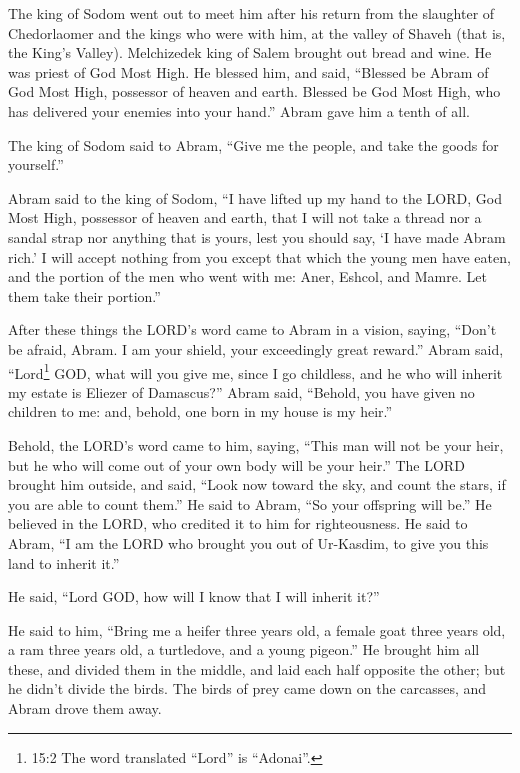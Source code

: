 \myverse{}The king of Sodom went out to meet him after his return from the slaughter of Chedorlaomer and the kings who were with him, at the valley of Shaveh (that is, the King’s Valley).  \myverse{}Melchizedek king of Salem brought out bread and wine. He was priest of God Most High.  \myverse{}He blessed him, and said, “Blessed be Abram of God Most High, possessor of heaven and earth.  \myverse{}Blessed be God Most High, who has delivered your enemies into your hand.”
Abram gave him a tenth of all.

\myverse{}The king of Sodom said to Abram, “Give me the people, and take the goods for yourself.”

\myverse{}Abram said to the king of Sodom, “I have lifted up my hand to the LORD, God Most High, possessor of heaven and earth,  \myverse{}that I will not take a thread nor a sandal strap nor anything that is yours, lest you should say, ‘I have made Abram rich.’  \myverse{}I will accept nothing from you except that which the young men have eaten, and the portion of the men who went with me: Aner, Eshcol, and Mamre. Let them take their portion.”

\mychapter{}
\myverse*{}After these things the LORD’s word came to Abram in a vision, saying, “Don’t be afraid, Abram. I am your shield, your exceedingly great reward.”
\myverse{}Abram said, “Lord\footnote{15:2 The word translated “Lord” is “Adonai”.} GOD, what will you give me, since I go childless, and he who will inherit my estate is Eliezer of Damascus?” \myverse{}Abram said, “Behold, you have given no children to me: and, behold, one born in my house is my heir.”

\myverse{}Behold, the LORD’s word came to him, saying, “This man will not be your heir, but he who will come out of your own body will be your heir.” \myverse{}The LORD brought him outside, and said, “Look now toward the sky, and count the stars, if you are able to count them.” He said to Abram, “So your offspring will be.” \myverse{}He believed in the LORD, who credited it to him for righteousness. \myverse{}He said to Abram, “I am the LORD who brought you out of Ur-Kasdim, to give you this land to inherit it.”

\myverse{}He said, “Lord GOD, how will I know that I will inherit it?”

\myverse{}He said to him, “Bring me a heifer three years old, a female goat three years old, a ram three years old, a turtledove, and a young pigeon.” \myverse{}He brought him all these, and divided them in the middle, and laid each half opposite the other; but he didn’t divide the birds. \myverse{}The birds of prey came down on the carcasses, and Abram drove them away.


